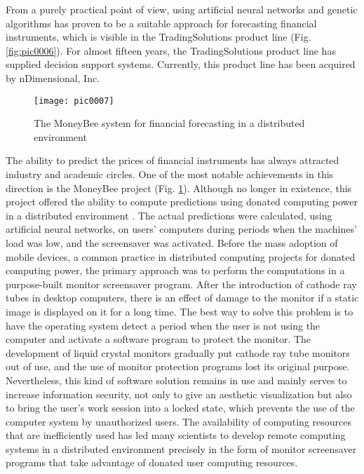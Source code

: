From a purely practical point of view, using artificial neural networks and genetic algorithms has proven to be a suitable approach for forecasting financial instruments, which is visible in the TradingSolutions product line (Fig. \ref{fig:pic0006}). For almost fifteen years, the TradingSolutions product line has supplied decision support systems. Currently, this product line has been acquired by nDimensional, Inc.

\begin{figure}[h]
\centering
\texttt{[image: pic0007]}
\caption{The MoneyBee system for financial forecasting in a distributed environment}
\label{fig:pic0007}
\end{figure}

The ability to predict the prices of financial instruments has always attracted industry and academic circles. One of the most notable achievements in this direction is the MoneyBee project (Fig. \ref{fig:pic0007}). Although no longer in existence, this project offered the ability to compute predictions using donated computing power in a distributed environment \cite{bohn}. The actual predictions were calculated, using artificial neural networks, on users' computers during periods when the machines' load was low, and the screensaver was activated. Before the mass adoption of mobile devices, a common practice in distributed computing projects for donated computing power, the primary approach was to perform the computations in a purpose-built monitor screensaver program. After the introduction of cathode ray tubes in desktop computers, there is an effect of damage to the monitor if a static image is displayed on it for a long time. The best way to solve this problem is to have the operating system detect a period when the user is not using the computer and activate a software program to protect the monitor. The development of liquid crystal monitors gradually put cathode ray tube monitors out of use, and the use of monitor protection programs lost its original purpose. Nevertheless, this kind of software solution remains in use and mainly serves to increase information security, not only to give an aesthetic visualization but also to bring the user's work session into a locked state, which prevents the use of the computer system by unauthorized users. The availability of computing resources that are inefficiently used has led many scientists to develop remote computing systems in a distributed environment precisely in the form of monitor screensaver programs that take advantage of donated user computing resources.


